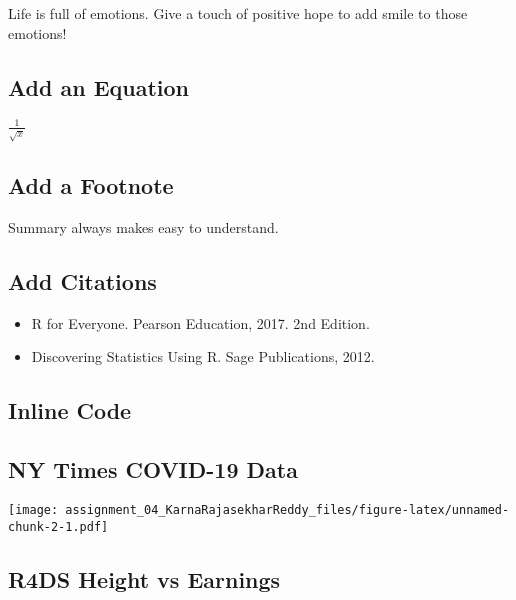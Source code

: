 \documentclass[
]{article}
\providecommand{\tightlist}{%
  \setlength{\itemsep}{0pt}\setlength{\parskip}{0pt}}
\begin{document}
Life is full of emotions. Give a touch of positive hope to add smile to
those emotions!

\hypertarget{add-an-equation}{%
\subsection{Add an Equation}\label{add-an-equation}}

\(\begin{equation}  \frac{1}{\sqrt x} \end{equation}\)

\hypertarget{add-a-footnote}{%
\subsection{Add a Footnote}\label{add-a-footnote}}

Summary always makes easy to understand.

\hypertarget{add-citations}{%
\subsection{Add Citations}\label{add-citations}}

\begin{itemize}
\tightlist
\item
  R for Everyone. Pearson Education, 2017. 2nd Edition.
\item
  Discovering Statistics Using R. Sage Publications, 2012.
\end{itemize}

\hypertarget{inline-code}{%
\subsection{Inline Code}\label{inline-code}}

\hypertarget{ny-times-covid-19-data}{%
\subsection{NY Times COVID-19 Data}\label{ny-times-covid-19-data}}

\texttt{[image: assignment\_04\_KarnaRajasekharReddy\_files/figure-latex/unnamed-chunk-2-1.pdf]}

\hypertarget{r4ds-height-vs-earnings}{%
\subsection{R4DS Height vs Earnings}\label{r4ds-height-vs-earnings}}
\end{document}
